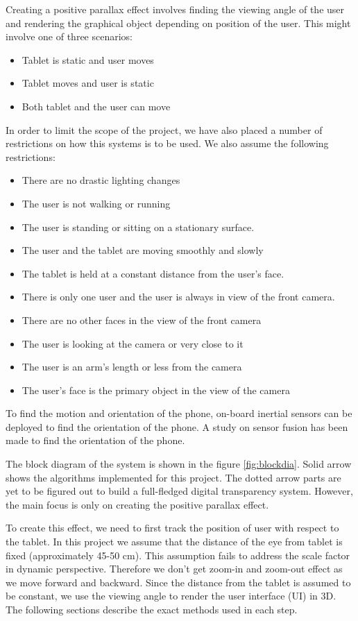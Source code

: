 \documentclass[12pt,twocolumn,letterpaper]{article}
\begin{document}
Creating a positive parallax effect involves finding the viewing angle of the user and rendering the graphical object depending on position of the user. This might involve one of three scenarios:
\begin{itemize}
\item Tablet is static and user moves
\item Tablet moves and user is static
\item Both tablet and the user can move
\end{itemize}

In order to limit the scope of the project, we have also placed a number of restrictions on how this systems is to be used.  We also assume the following restrictions:

\begin{itemize}
\item There are no drastic lighting changes
\item The user is not walking or running
\item The user is standing or sitting on a stationary surface.
\item The user and the tablet are moving smoothly and slowly
\item The tablet is held at a constant distance from the user's face.
\item There is only one user and the user is always in view of the front camera.
\item There are no other faces in the view of the front camera
\item The user is looking at the camera or very close to it
\item The user is an arm's length or less from the camera
\item The user's face is the primary object in the view of the camera
\end{itemize}

To find the motion and orientation of the phone, on-board inertial sensors can be deployed to find the orientation of the phone. A study on sensor fusion has been made to find the orientation of the phone.

The block diagram of the system is shown in the figure  \ref{fig:blockdia}. Solid arrow shows the algorithms implemented for this project. The dotted arrow parts are yet to be figured out to build a full-fledged digital transparency system. However, the main focus is only on creating the positive parallax effect.

To create this effect, we need to first track the position of user with respect to the tablet. In this project we assume that the distance of the eye from tablet is fixed (approximately 45-50 cm). This assumption fails to address the scale factor in dynamic perspective. Therefore we don't get zoom-in and zoom-out effect as we move forward and backward. Since the distance from the tablet is assumed to be constant, we use the viewing angle to render the user interface (UI) in 3D. The following sections describe the exact methods used in each step.
\end{document}
